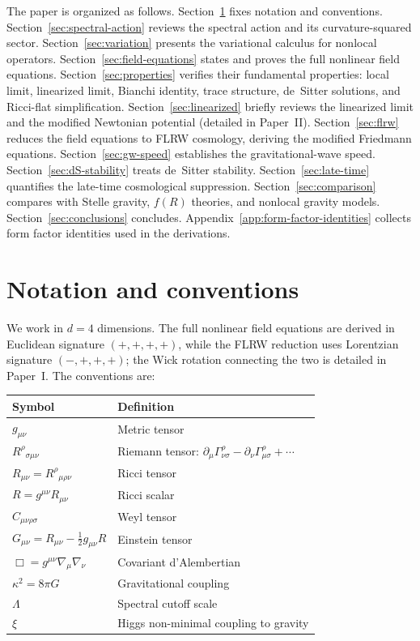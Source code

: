 \documentclass[12pt,a4paper]{article}
\newcommand{\Lam}{\Lambda}
\theoremstyle{plain}
\theoremstyle{definition}
\begin{document}
The paper is organized as follows.  Section~\ref{sec:conventions} fixes
notation and conventions.  Section~\ref{sec:spectral-action} reviews the
spectral action and its curvature-squared sector.
Section~\ref{sec:variation} presents the variational calculus for nonlocal
operators.  Section~\ref{sec:field-equations} states and proves the full
nonlinear field equations.  Section~\ref{sec:properties} verifies their
fundamental properties: local limit, linearized limit, Bianchi identity,
trace structure, de~Sitter solutions, and Ricci-flat simplification.
Section~\ref{sec:linearized} briefly reviews the linearized limit and the
modified Newtonian potential (detailed in Paper~II).
Section~\ref{sec:flrw} reduces the field equations to FLRW cosmology,
deriving the modified Friedmann equations.
Section~\ref{sec:gw-speed} establishes the gravitational-wave speed.
Section~\ref{sec:dS-stability} treats de~Sitter stability.
Section~\ref{sec:late-time} quantifies the late-time cosmological
suppression.
Section~\ref{sec:comparison} compares with Stelle gravity, $f(R)$ theories,
and nonlocal gravity models.
Section~\ref{sec:conclusions} concludes.
Appendix~\ref{app:form-factor-identities} collects form factor identities
used in the derivations.

\section{Notation and conventions}
\label{sec:conventions}

We work in $d = 4$ dimensions.  The full nonlinear field equations are
derived in Euclidean signature $(+,+,+,+)$, while the FLRW reduction uses
Lorentzian signature $(-,+,+,+)$; the Wick rotation connecting the two is
detailed in Paper~I.  The conventions are:

\begin{center}
\begin{tabular}{ll}
\toprule
Symbol & Definition \\
\midrule
$g_{\mu\nu}$ & Metric tensor \\
$R^{\rho}{}_{\sigma\mu\nu}$ & Riemann tensor:
  $\partial_\mu\Gamma^{\rho}_{\nu\sigma}
  - \partial_\nu\Gamma^{\rho}_{\mu\sigma} + \cdots$ \\
$R_{\mu\nu} = R^{\rho}{}_{\mu\rho\nu}$ & Ricci tensor \\
$R = g^{\mu\nu}R_{\mu\nu}$ & Ricci scalar \\
$C_{\mu\nu\rho\sigma}$ & Weyl tensor \\
$G_{\mu\nu} = R_{\mu\nu} - \tfrac{1}{2}g_{\mu\nu}R$ & Einstein tensor \\
$\Box = g^{\mu\nu}\nabla_\mu\nabla_\nu$ & Covariant d'Alembertian \\
$\kappa^2 = 8\pi G$ & Gravitational coupling \\
$\Lam$ & Spectral cutoff scale \\
$\xi$ & Higgs non-minimal coupling to gravity \\
\bottomrule
\end{tabular}
\end{center}
\end{document}
